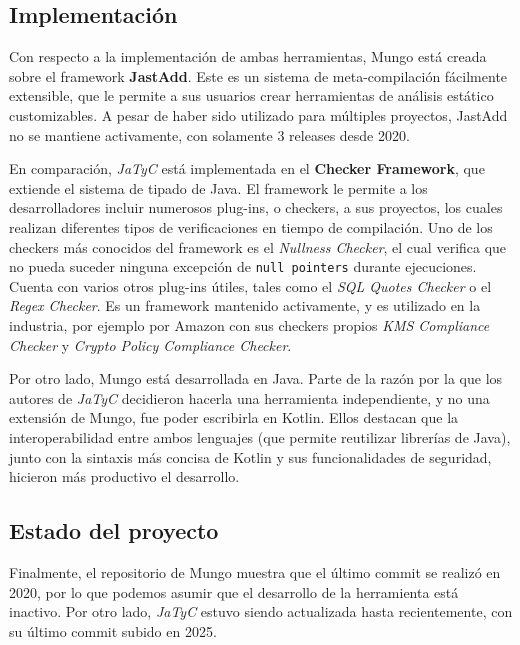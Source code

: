 \subsection{Implementación}
\label{mungo:implementacion}

Con respecto a la implementación de ambas herramientas, Mungo está creada sobre el framework \textbf{JastAdd}\cite{jastadd:website}. Este es un sistema de meta-compilación fácilmente extensible, que le permite a sus usuarios crear herramientas de análisis estático customizables. A pesar de haber sido utilizado para múltiples proyectos\cite{jastadd:applications}, JastAdd no se mantiene activamente, con solamente 3 releases desde 2020.

En comparación, \textit{JaTyC} está implementada en el \textbf{Checker Framework}\cite{checker-framework}, que extiende el sistema de tipado de Java. El framework le permite a los desarrolladores incluir numerosos plug-ins, o checkers, a sus proyectos, los cuales realizan diferentes tipos de verificaciones en tiempo de compilación. Uno de los checkers más conocidos del framework es el \textit{Nullness Checker}, el cual verifica que no pueda suceder ninguna excepción de \texttt{null pointers} durante ejecuciones. Cuenta con varios otros plug-ins útiles, tales como el \textit{SQL Quotes Checker} o el \textit{Regex Checker}. Es un framework mantenido activamente, y es utilizado en la industria, por ejemplo por Amazon con sus checkers propios \textit{KMS Compliance Checker}\cite{aws:kms-compliance-checker} y \textit{Crypto Policy Compliance Checker}\cite{aws:crypto-policy-compliance-checker}.

Por otro lado, Mungo está desarrollada en Java. Parte de la razón por la que los autores de \textit{JaTyC} decidieron hacerla una herramienta independiente, y no una extensión de Mungo, fue poder escribirla en Kotlin\cite{kotlin}. Ellos destacan que la interoperabilidad entre ambos lenguajes (que permite reutilizar librerías de Java), junto con la sintaxis más concisa de Kotlin y sus funcionalidades de seguridad, hicieron más productivo el desarrollo.

\subsection{Estado del proyecto}

Finalmente, el repositorio de Mungo\cite{mungo:repo} muestra que el último commit se realizó en 2020, por lo que podemos asumir que el desarrollo de la herramienta está inactivo. Por otro lado, \textit{JaTyC} estuvo siendo actualizada hasta recientemente, con su último commit subido en 2025.
